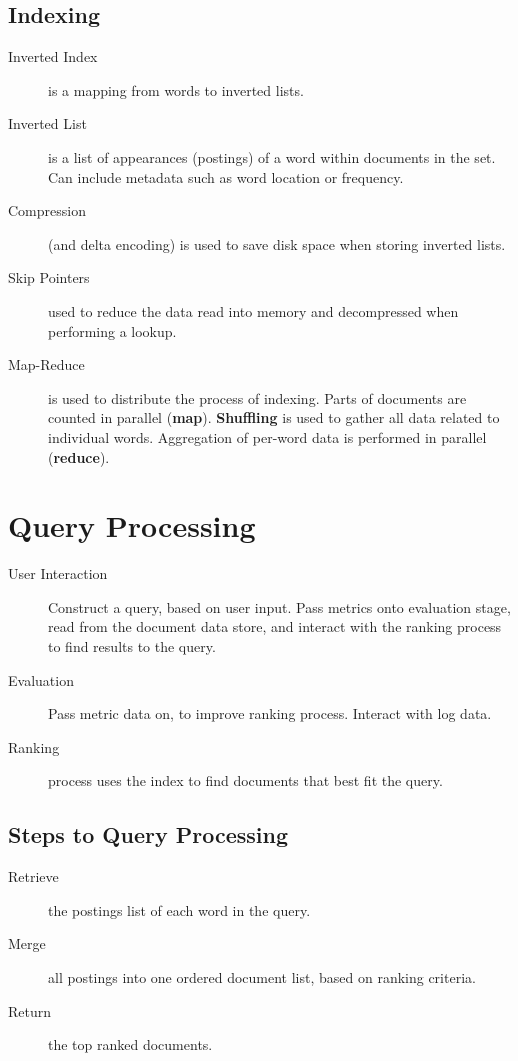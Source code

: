 \documentclass[landscape]{cheat}
\begin{document}
\begin{multicols*}{3}
\subsection{Indexing}
\begin{description}
    \item[Inverted Index] is a mapping from words to inverted lists.
    \item[Inverted List] is a list of appearances (postings) of a word within documents in the set.
        Can include metadata such as word location or frequency.
    \item[Compression] (and delta encoding) is used to save disk space when storing inverted lists.
    \item[Skip Pointers] used to reduce the data read into memory and decompressed when performing a lookup.
    \item[Map-Reduce] is used to distribute the process of indexing.
        Parts of documents are counted in parallel (\textbf{map}).
        \textbf{Shuffling} is used to gather all data related to individual words.
        Aggregation of per-word data is performed in parallel (\textbf{reduce}).
\end{description}

\section{Query Processing}
\begin{description}
    \item[User Interaction] Construct a query, based on user input.
        Pass metrics onto evaluation stage, read from the document data store, and interact with the ranking process to find results to the query.
    \item[Evaluation] Pass metric data on, to improve ranking process. Interact with log data.
    \item[Ranking] process uses the index to find documents that best fit the query.
\end{description}

\subsection{Steps to Query Processing}
\begin{description}
    \item[Retrieve] the postings list of each word in the query.
    \item[Merge] all postings into one ordered document list, based on ranking criteria.
    \item[Return] the top ranked documents.
\end{description}


\end{multicols*}
\end{document}
